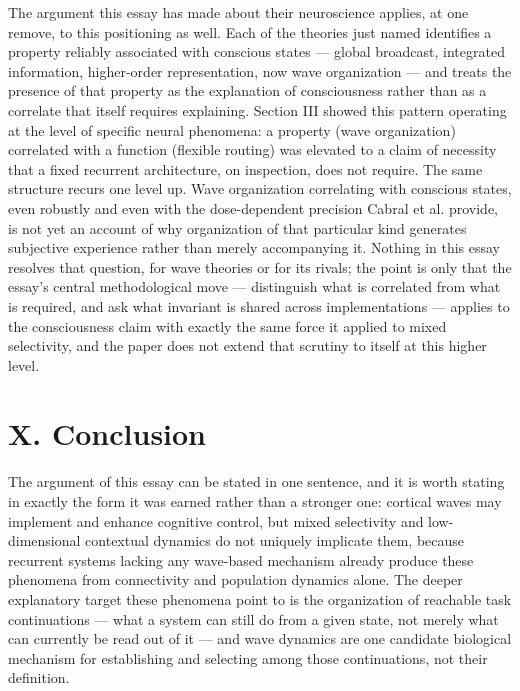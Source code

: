 \documentclass[11pt]{article}
\begin{document}
The argument this essay has made about their neuroscience applies, at one remove, to this positioning as well. Each of the theories just named identifies a property reliably associated with conscious states — global broadcast, integrated information, higher-order representation, now wave organization — and treats the presence of that property as the explanation of consciousness rather than as a correlate that itself requires explaining. Section III showed this pattern operating at the level of specific neural phenomena: a property (wave organization) correlated with a function (flexible routing) was elevated to a claim of necessity that a fixed recurrent architecture, on inspection, does not require. The same structure recurs one level up. Wave organization correlating with conscious states, even robustly and even with the dose-dependent precision Cabral et al. provide, is not yet an account of why organization of that particular kind generates subjective experience rather than merely accompanying it. Nothing in this essay resolves that question, for wave theories or for its rivals; the point is only that the essay's central methodological move — distinguish what is correlated from what is required, and ask what invariant is shared across implementations — applies to the consciousness claim with exactly the same force it applied to mixed selectivity, and the paper does not extend that scrutiny to itself at this higher level.
\section*{X. Conclusion}

The argument of this essay can be stated in one sentence, and it is worth stating in exactly the form it was earned rather than a stronger one: cortical waves may implement and enhance cognitive control, but mixed selectivity and low-dimensional contextual dynamics do not uniquely implicate them, because recurrent systems lacking any wave-based mechanism already produce these phenomena from connectivity and population dynamics alone. The deeper explanatory target these phenomena point to is the organization of reachable task continuations — what a system can still do from a given state, not merely what can currently be read out of it — and wave dynamics are one candidate biological mechanism for establishing and selecting among those continuations, not their definition.
\end{document}
